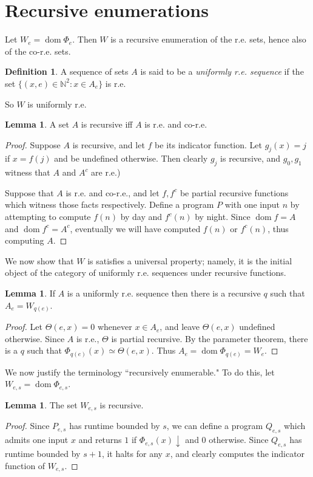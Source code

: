 \documentclass[12pt]{report}
\newcommand{\NN}{\mathbb{N}}
\newcommand{\halts}{\downarrow}
\DeclareMathOperator{\dom}{dom}
\newcommand{\dfn}[1]{\emph{#1}\index{#1}}
\theoremstyle{definition}
\newtheorem{lemma}[theorem]{Lemma}
\newtheorem{definition}[theorem]{Definition}
\begin{document}
\section{Recursive enumerations}
Let $W_e = \dom \Phi_e$. Then $W$ is a recursive enumeration of the r.e. sets, hence also of the co-r.e. sets.
\begin{definition}
A sequence of sets $A$ is said to be a \dfn{uniformly r.e. sequence} if the set $\{(x, e) \in \NN^2: x \in A_e\}$ is r.e.
\end{definition}
So $W$ is uniformly r.e.
\begin{lemma}
A set $A$ is recursive iff $A$ is r.e. and co-r.e.
\end{lemma}
\begin{proof}
Suppose $A$ is recursive, and let $f$ be its indicator function. Let $g_j(x) = j$ if $x = f(j)$ and be undefined otherwise. Then clearly $g_j$ is recursive, and $g_0,g_1$ witness that $A$ and $A^c$ are r.e.)

Suppose that $A$ is r.e. and co-r.e., and let $f,f^c$ be partial recursive functions which witness those facts respectively. Define a program $P$ with one input $n$ by attempting to compute $f(n)$ by day and $f^c(n)$ by night. Since $\dom f = A$ and $\dom f^c = A^c$, eventually we will have computed $f(n)$ or $f^c(n)$, thus computing $A$.
\end{proof}
We now show that $W$ is satisfies a universal property; namely, it is the initial object of the category of uniformly r.e. sequences under recursive functions.
\begin{lemma}
  If $A$ is a uniformly r.e. sequence then there is a recursive $q$ such that $A_e = W_{q(e)}$.
\end{lemma}
\begin{proof}
Let $\Theta(e, x) = 0$ whenever $x \in A_e$, and leave $\Theta(e, x)$ undefined otherwise. Since $A$ is r.e., $\Theta$ is partial recursive. By the parameter theorem, there is a $q$ such that $\Phi_{q(e)}(x) \simeq \Theta(e, x)$. Thus $A_e = \dom \Phi_{q(e)} = W_e$.
\end{proof}

We now justify the terminology ``recursively enumerable." To do this, let $W_{e,s} = \dom \Phi_{e,s}$.
\begin{lemma}
The set $W_{e,s}$ is recursive.
\end{lemma}
\begin{proof}
Since $P_{e,s}$ has runtime bounded by $s$, we can define a program $Q_{e,s}$ which admits one input $x$ and returns $1$ if $\Phi_{e,s}(x) \halts$ and $0$ otherwise. Since $Q_{e,s}$ has runtime bounded by $s+1$, it halts for any $x$, and clearly computes the indicator function of $W_{e,s}$.
\end{proof}
\end{document}
